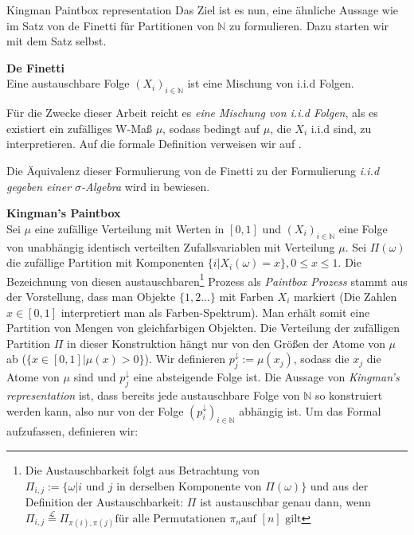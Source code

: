 \begin{section}{Kingman Paintbox representation}
Das Ziel ist es nun, eine ähnliche Aussage wie im Satz von de Finetti für Partitionen von $\mathbb{N}$ zu formulieren. Dazu starten wir mit dem Satz selbst.
\begin{theorem}\cite[Theorem 3.1]{aldous2006ecole}{\textbf{De Finetti}}\\
    Eine austauschbare Folge $(X_i)_{i \in \mathbb{N}}$ ist eine Mischung von i.i.d Folgen.
\end{theorem}
\begin{Bemerkung}
    Für die Zwecke dieser Arbeit reicht es \textit{eine Mischung von i.i.d Folgen}, als \glqq es existiert ein zufälliges W-Maß $\mu$, sodass bedingt auf $\mu$, die $X_i$ i.i.d sind\grqq, zu interpretieren. Auf die formale Definition verweisen wir auf \cite[Abschnitt 1.2]{aldous2006ecole}.
\end{Bemerkung}
\begin{Bemerkung}
    Die Äquivalenz dieser Formulierung von de Finetti zu der Formulierung \textit{i.i.d gegeben einer $\sigma$-Algebra} wird in \cite[Lemma 2.18]{aldous2006ecole} bewiesen.  
\end{Bemerkung}
\noindent \textbf{\fontsize{14}{18}\selectfont Kingman's Paintbox}\\
Sei $\mu$ eine zufällige Verteilung mit Werten in $[0,1]$ und $(X_i)_{i \in \mathbb{N}}$ eine Folge von unabhängig identisch verteilten Zufallsvariablen mit Verteilung $\mu$. Sei $\Pi(\omega)$ die zufällige Partition mit Komponenten $\{i| X_i(\omega) = x\},  0 \leq x \leq 1$. Die Bezeichnung von diesen austauschbaren\footnote{Die Austauschbarkeit folgt aus Betrachtung von $\Pi_{i,j} := \{\omega | i \text{ und } j \text{ in derselben Komponente von } \Pi(\omega)\}$ und aus der Definition der Austauschbarkeit: $\Pi$ ist austauschbar genau dann, wenn $\Pi_{i,j} \stackrel{\mathcal{L}}{=} \Pi_{\pi(i),\pi(j)} \text{für alle Permutationen }\pi_n \text{auf }[n] \text{ gilt}$} Prozess als \textit{Paintbox Prozess} stammt aus der Vorstellung, dass man Objekte $\{1,2 ...\}$ mit Farben $X_i$ markiert (Die Zahlen $x \in [0,1]$ interpretiert man als Farben-Spektrum). 
Man erhält somit eine Partition von Mengen von gleichfarbigen Objekten. Die Verteilung der zufälligen Partition $\Pi$ in dieser Konstruktion hängt nur von den Größen der Atome von $\mu$ ab ($\{x \in [0,1] | \mu(x) > 0 \}$). Wir definieren $p^\downarrow_j := \mu(x_j)$, sodass die $x_j$ die Atome von $\mu$ sind und $p_j^\downarrow$ eine absteigende Folge ist. Die Aussage von \textit{Kingman's representation} ist, dass bereits jede austauschbare Folge von $\mathbb{N}$ so konstruiert werden kann, also nur von der Folge $(p^\downarrow_i)_{i \in \mathbb{N}}$ abhängig ist. Um das Formal aufzufassen, definieren wir:

\end{section}
